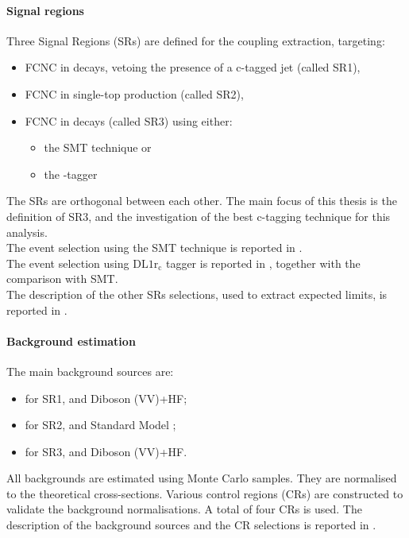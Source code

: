\paragraph{Signal regions}
Three Signal Regions (SRs) are defined for the \tZc coupling extraction, targeting:
\begin{itemize}
	\item FCNC \tZc in \ttbar decays, vetoing the presence of a c-tagged jet (called SR1\tZc), 
	\item FCNC \tZc in single-top production (called SR2\tZc), 
	\item FCNC \tZc in \ttbar decays (called SR3\tZc) using either:
	\begin{itemize}
		\item the SMT technique or
		\item the \Pqc-tagger \DLrc
	\end{itemize}
\end{itemize}
The SRs are orthogonal between each other. 
The main focus of this thesis is the definition of SR3\tZc, and the investigation of the best c-tagging technique for this analysis.\\
The event selection using the SMT technique is reported in .\\
The event selection using $\mathrm{DL1r_{c}}$ tagger is reported in , together with the comparison with SMT.\\
The description of the other SRs selections, used to extract expected limits, is reported in .\\

\paragraph{Background estimation}
The main background sources are:
\begin{itemize}
	\item for SR1\tZc, \ttZ and Diboson (VV)+HF;
	\item for SR2\tZc, \VVHF and Standard Model \tZq ;
	\item for SR3\tZc, \ttZ and Diboson (VV)+HF.
\end{itemize}

\noindent All backgrounds are estimated using Monte Carlo samples. They are
normalised to the theoretical cross-sections. 
Various control regions (CRs) are constructed to validate the
background normalisations. A total of four CRs is used. 
The description of the background sources and the CR selections is
reported in .

